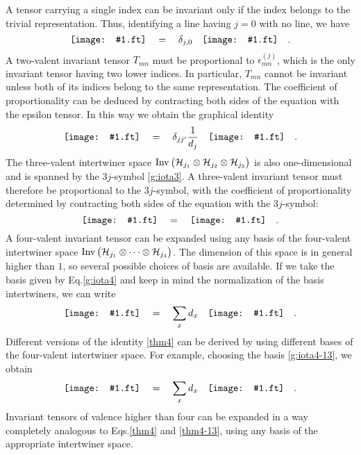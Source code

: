\documentclass[graybox, secnum]{svmult}
\makeatletter
\newcommand{\ft}{pdf}        %
\newcommand{\makeSymbol}[1]{\mathord{\vcenter{\hbox{#1}}}}
\newcommand{\Symbol}[1]{\makeSymbol{\texttt{[image: \#1.\\ft]}}}
\newcommand{\Eq}[1]{Eq.\@\xspace\eqref{#1}}
\newcommand{\Eqs}[1]{Eqs.\@\xspace\eqref{#1}}
\makeatother
\begin{document}
A tensor carrying a single index can be invariant only if the index belongs to the trivial representation. Thus, identifying a line having $j=0$ with no line, we have
\begin{equation}
	\Symbol{1block} \quad = \quad \delta_{j,0}\quad\Symbol{1block-noline} \quad . 
	\label{thm1}
\end{equation}
A two-valent invariant tensor $T_{mn}$ must be proportional to $\epsilon^{(j)}_{mn}$, which is the only invariant tensor having two lower indices. In particular, $T_{mn}$ cannot be invariant unless both of its indices belong to the same representation. The coefficient of proportionality can be deduced by contracting both sides of the equation with the epsilon tensor. In this way we obtain the graphical identity
\begin{equation}
	\Symbol{2block} \quad = \quad \delta_{jj'}\frac{1}{d_j}\quad\Symbol{2block-exp} \quad . \vspace{4pt}
	\label{thm2}
\end{equation}
The three-valent intertwiner space ${\rm Inv}\,\bigl({\cal H}_{j_1}\otimes{\cal H}_{j_2}\otimes{\cal H}_{j_3}\bigr)$ is also one-dimensional and is spanned by the $3j$-symbol \eqref{g:iota3}. A three-valent invariant tensor must therefore be proportional to the $3j$-symbol, with the coefficient of proportionality determined by contracting both sides of the equation with the $3j$-symbol:
\begin{equation}
	\Symbol{3block} \quad = \quad \Symbol{3block-exp} \quad . 
	\label{thm3}
\end{equation}
A four-valent invariant tensor can be expanded using any basis of the four-valent intertwiner space ${\rm Inv}\,\bigl({\cal H}_{j_1}\otimes\cdots\otimes{\cal H}_{j_4}\bigr)$. The dimension of this space is in general higher than $1$, so several possible choices of basis are available. If we take the basis given by \Eq{g:iota4} and keep in mind the normalization of the basis intertwiners, we can write
\vspace{-4pt}
\begin{equation}
	\Symbol{4block} \quad = \quad \sum_x d_x\quad\Symbol{4block-exp} \quad . 
	\label{thm4}
\end{equation}
Different versions of the identity \eqref{thm4} can be derived by using different bases of the four-valent intertwiner space. For example, choosing the basis \eqref{g:iota4-13}, we obtain
\begin{equation}
	\Symbol{4block} \quad = \quad \sum_x d_x\quad\Symbol{4block-exp-13} \quad . 
	\label{thm4-13}
\end{equation}
Invariant tensors of valence higher than four can be expanded in a way completely analogous to \Eqs{thm4} and \eqref{thm4-13}, using any basis of the appropriate intertwiner space.
\end{document}
